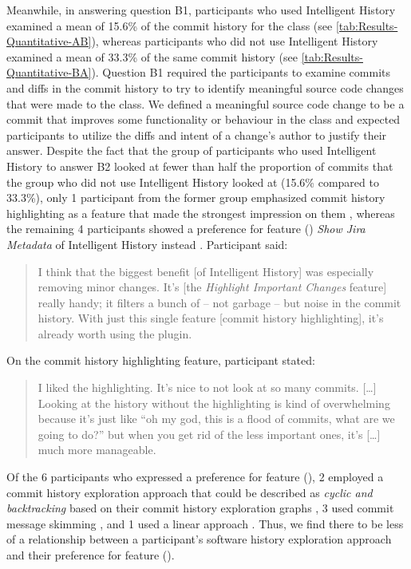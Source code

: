 Meanwhile, in answering question B1, participants who used Intelligent History 
examined a mean of 15.6\% of the commit history for the  class (see \autoref{tab:Results-Quantitative-AB}),
whereas participants who did not use Intelligent History examined a mean of 33.3\% of the same 
commit history (see \autoref{tab:Results-Quantitative-BA}).
Question B1 required the participants to examine commits and diffs in the  commit history 
to try to identify meaningful source code changes that were made to the class.
We defined a meaningful source code change to be a commit that improves some functionality 
or behaviour in the class and expected participants to utilize the diffs and intent of a change's author to justify their answer.
Despite the fact that the group of participants who used Intelligent History to answer B2 looked at fewer than half the 
proportion of commits that the group who did not use Intelligent History looked at (15.6\% compared to 33.3\%),
only 1 participant from the former group emphasized commit history highlighting as a feature that made the strongest impression on them , 
whereas the remaining 4 participants showed a preference for feature 
() \textit{Show Jira Metadata} of Intelligent History instead .
Participant  said:

\begin{quote}
  I think that the biggest benefit [of Intelligent History] was especially removing minor changes. 
  It’s [the \textit{Highlight Important Changes} feature] really handy; it filters a bunch of -- not garbage -- but noise in the commit history. 
  With just this single feature [commit history highlighting], it’s already worth using the plugin.
\end{quote}

On the commit history highlighting feature, participant  stated:

\begin{quote}
  I liked the highlighting. 
  It’s nice to not look at so many commits. 
  [\dots] Looking at the history without the highlighting is kind of overwhelming because it’s just like ``oh my god, this is a flood of commits, 
  what are we going to do?'' 
  but when you get rid of the less important ones, it’s [\dots] much more manageable.
\end{quote}

Of the 6 participants who expressed a preference for feature (), 
2 employed a commit history exploration approach that could be described as \textit{cyclic and backtracking} based on their commit history exploration graphs ,
3 used commit message skimming , and 1 used a linear approach .
Thus, we find there to be less of a relationship between a participant's software history exploration approach 
and their preference for feature ().

